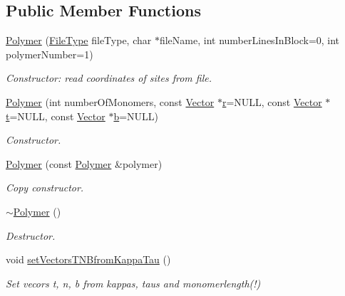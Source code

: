\subsection*{Public Member Functions}
\begin{DoxyCompactItemize}
\item 
\hyperlink{class_p_c_a_1_1_polymer_ac835d908dc32b787ca80f26cd0e6c68b}{Polymer} (\hyperlink{class_p_c_a_1_1_polymer_a1df36a764fbf04ccd5cbe8edb49d43bd}{File\+Type} file\+Type, char $\ast$file\+Name, int number\+Lines\+In\+Block=0, int polymer\+Number=1)
\begin{DoxyCompactList}\small\item\em Constructor\+: read coordinates of sites from file. \end{DoxyCompactList}\item 
\hyperlink{class_p_c_a_1_1_polymer_ac2645c33eba98a8ec1670d69b92060c8}{Polymer} (int number\+Of\+Monomers, const \hyperlink{class_p_c_a_1_1_vector}{Vector} $\ast$\hyperlink{class_p_c_a_1_1_polymer_a9822e3b9c3420a04a689706b84e586ca}{r}=N\+U\+LL, const \hyperlink{class_p_c_a_1_1_vector}{Vector} $\ast$\hyperlink{class_p_c_a_1_1_polymer_a0fd79e19a8c09a9e4c72903924151b5e}{t}=N\+U\+LL, const \hyperlink{class_p_c_a_1_1_vector}{Vector} $\ast$\hyperlink{class_p_c_a_1_1_polymer_ad93199b0187ab557476153b204b921c7}{b}=N\+U\+LL)
\begin{DoxyCompactList}\small\item\em Constructor. \end{DoxyCompactList}\item 
\hyperlink{class_p_c_a_1_1_polymer_a1ce99540db06e9e48392423ba516cd2f}{Polymer} (const \hyperlink{class_p_c_a_1_1_polymer}{Polymer} \&polymer)
\begin{DoxyCompactList}\small\item\em Copy constructor. \end{DoxyCompactList}\item 
\hyperlink{class_p_c_a_1_1_polymer_ac0d31fa5c6bee720f8069805d6669606}{$\sim$\+Polymer} ()
\begin{DoxyCompactList}\small\item\em Destructor. \end{DoxyCompactList}\item 
void \hyperlink{class_p_c_a_1_1_polymer_a55787461ed50776c48819a5cc3911c38}{set\+Vectors\+T\+N\+Bfrom\+Kappa\+Tau} ()
\begin{DoxyCompactList}\small\item\em Set vecors t, n, b from kappas, taus and monomerlength(!) \end{DoxyCompactList}\item 

\end{DoxyCompactItemize}
